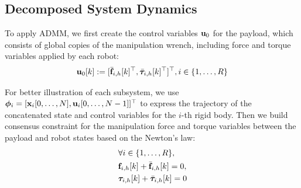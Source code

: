 \subsection{Decomposed System Dynamics}
To apply ADMM, we first create the control variables $\mathbf{u}_0$ for the payload, which consists of global copies of the manipulation wrench, including force and torque variables applied by each robot:
\begin{equation}
    \begin{aligned}
        \mathbf{u}_{0}[k] := [\bar{\mathbf{f}}_{i,h}[k]^{\top}, \bar{\bm{\tau}}_{i,h}[k]^{\top}]^{\top}, i \in \{1, \dots, R\}
    \end{aligned}
\end{equation}


For better illustration of each subsystem, we use $\bm{\phi}_i = [\mathbf{x}_i[0,\dots,N], \mathbf{u}_i[0,\dots,N-1]]^{\top}$ to express the trajectory of the concatenated state and control variables for the $i$-th rigid body. Then we build consensus constraint for the manipulation force and torque variables between the payload and robot states based on the Newton's law:
\begin{subequations}\label{eq:consensus_constraint}
    \begin{align}
        \nonumber & \forall i \in \{1, \dots, R\},\\
        & \mathbf{f}_{i,h}[k] + \bar{\mathbf{f}}_{i,h}[k] = 0,\\
        & \bm{\tau}_{i,h}[k] + \bar{\bm{\tau}}_{i,h}[k] = 0
    \end{align}
\end{subequations}

